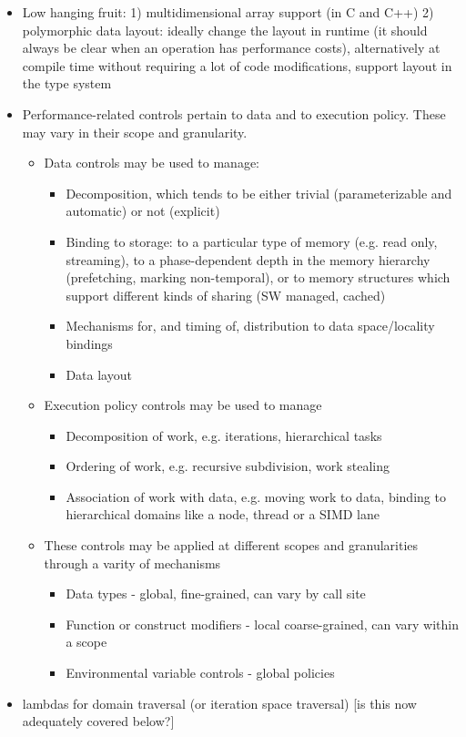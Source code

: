 \begin{itemize}
\begin{itemize}
  \item Low hanging fruit: 
    1) multidimensional array support (in C and C++) 
    2) polymorphic data layout: 
    ideally change the layout in runtime (it should always be clear when an operation has performance costs),
    alternatively at compile time without requiring a lot of code modifications, 
    support layout in the type system 
  \item Performance-related controls pertain to data and to execution policy.  These may vary in their scope and granularity.
    \begin{itemize}
    \item Data controls may be used to manage:
      \begin{itemize} 
      \item Decomposition, which tends to be either trivial (parameterizable and automatic) or not (explicit)
      \item Binding to storage: to a particular type of memory (e.g. read only, streaming), to a phase-dependent depth in the memory hierarchy (prefetching, marking non-temporal), or to memory structures which support different kinds of sharing (SW managed, cached)
      \item Mechanisms for, and timing of, distribution to data space/locality bindings
      \item Data layout
      \end{itemize}
    \item Execution policy controls may be used to manage
      \begin{itemize} 
      \item Decomposition of work, e.g. iterations, hierarchical tasks
      \item Ordering of work, e.g. recursive subdivision, work stealing
      \item Association of work with data, e.g. moving work to data, binding to hierarchical domains like a node, thread or a SIMD lane
      \end{itemize}
    \item These controls may be applied at different scopes and granularities through a varity of mechanisms
      \begin{itemize} 
      \item Data types - global, fine-grained, can vary by call site
      \item Function or construct modifiers - local coarse-grained, can vary within a scope
      \item Environmental variable controls - global policies
      \end{itemize}
    \end{itemize}
  \item lambdas for domain traversal (or iteration space traversal) [is this now adequately covered below?]
  \end{itemize}
  

\end{itemize}

